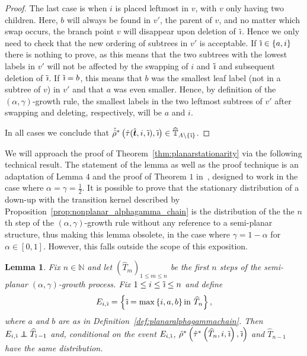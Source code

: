 \documentclass[a4paper, final]{amsart}
\theoremstyle{plain}
\newtheorem{lemma}[thm]{Lemma}
\theoremstyle{definition}
\newcommand{\that}[1][t]{\hat{\boldsymbol{#1}}} %
\newcommand{\That}[1][T]{\widehat{#1}}
\newcommand{\Thatspace}[1][\T]{\widehat{\boldsymbol{#1}}} %
\newcommand{\T}{\mathbb{T}}
\DeclareMathOperator{\tildei}{\tilde{\textit{\i}}}
\newcommand\independent{\protect\mathpalette{\protect\independenT}{\perp}}
\def\independenT#1#2{\mathrel{\rlap{$#1#2$}\mkern2mu{#1#2}}}
\newcommand{\nin}{{n \in \mathbb{N}}}
\begin{document}
\begin{proof}
  The last case is when $i$ is placed leftmost in $v$, with $v$ only having two children.
  Here, $b$ will always be found in $v'$, the parent of $v$, and no matter which swap occurs, the branch point $v$ will disappear upon deletion of $\tildei$.
  Hence we only need to check that the new ordering of subtrees in $v'$ is acceptable.
  If $\tildei \in \{a, i\}$ there is nothing to prove, as this means that the two subtrees with the lowest labels in $v'$ will not be affected by the swapping of $i$ and $\tildei$ and subsequent deletion of $\tildei$.
  If $\tildei = b$, this means that $b$ was the smallest leaf label (not in a subtree of $v$) in $v'$ and that $a$ was even smaller.
  Hence, by definition of the $(\alpha, \gamma)$-growth rule, the smallest labels in the two leftmost subtrees of $v'$ after swapping and deleting, respectively, will be $a$ and $i$.
  
  In all cases we conclude that $\mathring{\hat{\rho}}^* \left(  \hat{\tau} (\that, i, \tildei), \tildei \right) \in \Thatspace_{A \setminus \{\tildei\}}$.
\end{proof}
%
We will approach the proof of Theorem~\ref{thm:planarstationarity} via the following technical result.
The statement of the lemma as well as the proof technique is an adaptation of Lemma $4$ and the proof of Theorem $1$ in~\cite{RefWorks:doc:5b4cbc93e4b07f5746e47014}, designed to work in the case where $\alpha = \gamma = \frac{1}{2}$.
It is possible to prove that the stationary distribution of a down-up with the transition kernel described by Proposition~\ref{prop:nonplanar_alphagamma_chain} is the distribution of the the $n$th step of the $(\alpha, \gamma)$-growth rule without any reference to a semi-planar structure, thus making this lemma obsolete, in the case where $\gamma = 1 - \alpha$ for $\alpha \in [0,1]$.
However, this falls outside the scope of this exposition.
%
\begin{lemma}\label{lemma:condind}
  Fix $\nin$ and let ${\left( \That_m \right)}_{1 \leq m \leq  n}$ be the first $n$ steps of the semi-planar $(\alpha, \gamma)$-growth process.
    Fix $1 \leq i \leq \tildei \leq n$ and define
    \begin{align}
      E_{i, \tildei} = \left\{ \tildei = \max\left\{i, a, b\right\} \text{in}\ \That_n \right\},
        \label{eq:condindlemma}
    \end{align}
    where $a$ and $b$ are as in Definition~\ref{def:planaralphagammachain}.
    Then $E_{i, \tildei} \independent \That_{\tildei - 1}$ and, conditional on the event $E_{i, \tildei}$, $\hat{\rho}^* \left( \hat{\tau}^* \left( \That_n, i, \tildei \right), \tildei \right)$ and $\That_{n-1}$ have the same distribution.
\end{lemma}
\end{document}
